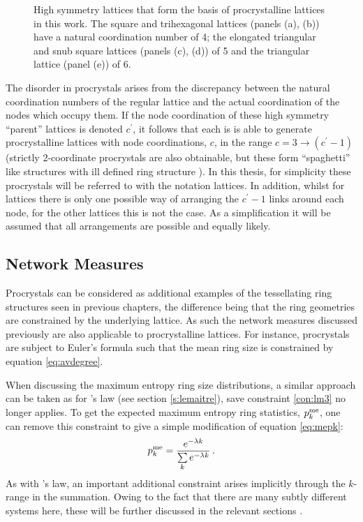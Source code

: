 \begin{figure}[bt]
     \caption{High symmetry lattices that form the basis of \td{} procrystalline lattices in this work. The square and trihexagonal lattices (panels (a), (b)) have a natural coordination number of 4; the elongated triangular and snub square lattices (panels (c), (d))  of 5 and the triangular lattice (panel (e)) of 6.}
     \label{fig:symlat}
\end{figure}

The disorder in procrystals arises from the discrepancy between the natural coordination numbers of the regular lattice and the actual coordination of the nodes which occupy them.
If the node coordination of these high symmetry ``parent'' lattices is denoted $c^\prime$, it follows that each is is able to generate procrystalline lattices with node coordinations, $c$, in the range $c=3\rightarrow \left(c^\prime-1\right)$ (strictly 2\--coordinate procrystals are also obtainable, but these form ``spaghetti'' like structures with ill defined ring structure \cite{Baise2018}).
In this thesis, for simplicity these procrystals will be referred to with the notation lattices.
In addition, whilst for lattices there is only one possible way of arranging the $c^\prime-1$ links around each node, for the other lattices this is not the case.
As a simplification it will be assumed that all arrangements are possible and equally likely.

\subsection{Network Measures}

Procrystals can be considered as additional examples of the tessellating ring structures seen in previous chapters, the difference being that the ring geometries are constrained by the underlying lattice. 
As such the network measures discussed previously are also applicable to procrystalline lattices.  
For instance, procrystals are subject to Euler's formula such that the mean ring size is constrained by equation \eqref{eq:avdegree}.

When discussing the maximum entropy ring size distributions, a similar approach can be taken as for \lm's law (see section \ref{s:lemaitre}), save constraint \eqref{con:lm3} no longer applies.
To get the expected maximum entropy ring statistics, $p^{\text{me}}_k$, one can remove this constraint to give a simple modification of equation \eqref{eq:mepk}:
\begin{equation}
    p^{\text{me}}_k = \frac{e^{-\lambda k}}{\sum\limits_k e^{-\lambda k}}\,.
\end{equation}
As with \lm's law, an important additional constraint arises implicitly through the $k$\--range in the summation.
Owing to the fact that there are many subtly different systems here, these will be further discussed in the relevant sections .

